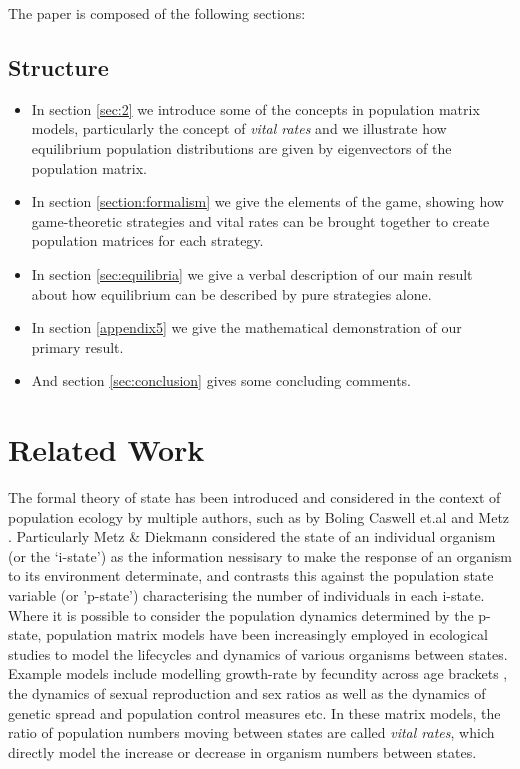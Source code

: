 The paper is composed of the following sections:

\subsection{Structure}
\begin{itemize}
\item In section \ref{sec:2} we introduce some of the concepts in population matrix models, particularly the concept of \textit{vital rates} and we illustrate how equilibrium population distributions are given by eigenvectors of the population matrix.
\item In section \ref{section:formalism} we give the elements of the game, showing how game-theoretic strategies and vital rates can be brought together to create population matrices for each strategy.
\item In section \ref{sec:equilibria} we give a verbal description of our main result about how equilibrium can be described by pure strategies alone.
\item In section \ref{appendix5} we give the mathematical demonstration of our primary result.
\item And section \ref{sec:conclusion} gives some concluding comments.
\end{itemize}


\section{Related Work}\label{sec:-1}

The formal theory of state has been introduced and considered in the context of population ecology by multiple authors, 
such as by Boling \cite{BOLING1973485} Caswell et.al \cite{nla.cat-vn662318} and Metz \cite{Metz1977}. Particularly Metz \& Diekmann\cite{nla.cat-vn2330051} considered the state of an individual organism (or the `i-state') as the information nessisary to make the response of an organism to its environment determinate, and contrasts this against the population state variable (or 'p-state') characterising the number of individuals in each i-state. 
Where it is possible to consider the population dynamics determined by the p-state, population matrix models have been increasingly employed in ecological studies to model the lifecycles and dynamics of various organisms between states.\cite{doi:10.1111/j.1461-0248.2010.01540.x}
Example models include modelling growth-rate by fecundity across age brackets \cite{leslie}, the dynamics of sexual reproduction and sex ratios \cite{Shyu2018,doi:10.1111/1365-2664.12177} as well as the dynamics of genetic spread and population control measures \cite{DEVRIES2020108875} etc.
In these matrix models, the ratio of population numbers moving between states are called \textit{vital rates}, which directly model the increase or decrease in organism numbers between states.

